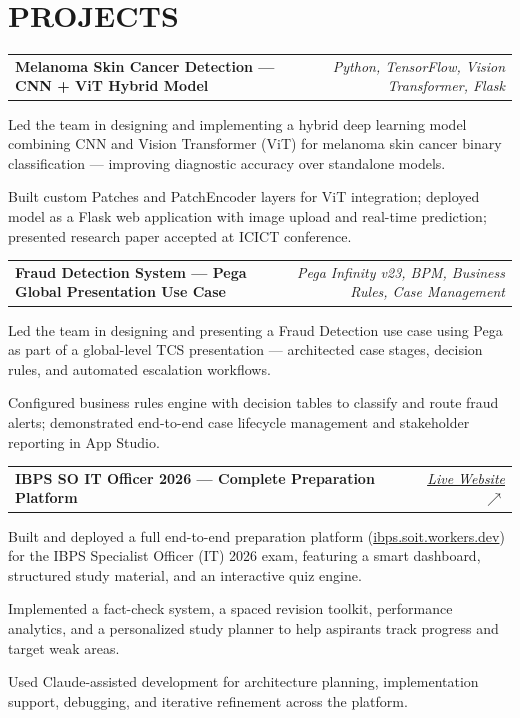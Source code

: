 \documentclass[10pt]{article}
\makeatletter
\newcommand{\entryrow}[3]{%
  \noindent\begin{tabularx}{\dimexpr\linewidth}{@{}X r@{}}
    \textbf{#1} & {\fontsize{9}{10.5}\selectfont\itshape\color{graytext}#2}\\
  \end{tabularx}%
  #3
}
\makeatother
\begin{document}
\section{PROJECTS}

\entryrow{Melanoma Skin Cancer Detection — CNN + ViT Hybrid Model}{Python, TensorFlow, Vision Transformer, Flask}{}
\begin{tightitemize}
\item Led the team in designing and implementing a hybrid deep learning model combining CNN and Vision Transformer (ViT) for melanoma skin cancer binary classification — improving diagnostic accuracy over standalone models.
\item Built custom Patches and PatchEncoder layers for ViT integration; deployed model as a Flask web application with image upload and real-time prediction; presented research paper accepted at ICICT conference.
\end{tightitemize}

\entryrow{Fraud Detection System — Pega Global Presentation Use Case}{Pega Infinity v23, BPM, Business Rules, Case Management}{}
\begin{tightitemize}
\item Led the team in designing and presenting a Fraud Detection use case using Pega as part of a global-level TCS presentation — architected case stages, decision rules, and automated escalation workflows.
\item Configured business rules engine with decision tables to classify and route fraud alerts; demonstrated end-to-end case lifecycle management and stakeholder reporting in App Studio.
\end{tightitemize}

\entryrow{IBPS SO IT Officer 2026 — Complete Preparation Platform}{\href{https://ibps.soit.workers.dev/}{Live Website $\nearrow$}}{}
\begin{tightitemize}
\item Built and deployed a full end-to-end preparation platform (\href{https://ibps.soit.workers.dev/}{ibps.soit.workers.dev}) for the IBPS Specialist Officer (IT) 2026 exam, featuring a smart dashboard, structured study material, and an interactive quiz engine.
\item Implemented a fact-check system, a spaced revision toolkit, performance analytics, and a personalized study planner to help aspirants track progress and target weak areas.
\item Used Claude-assisted development for architecture planning, implementation support, debugging, and iterative refinement across the platform.
\end{tightitemize}
\end{document}
